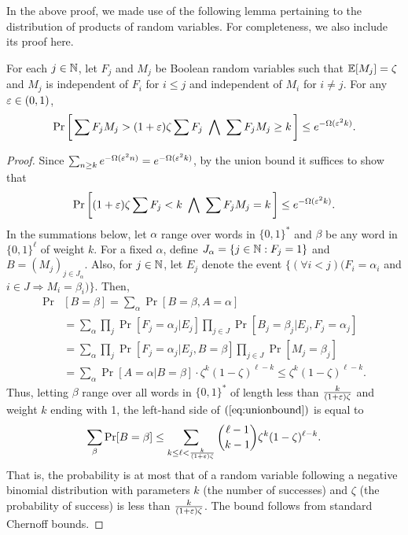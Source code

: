 In the above proof, we made use of the following lemma
pertaining to the distribution of products of random variables.
For completeness, we also include its proof here.

\begin{lemma}\label{lemma:negbin}%
	For each $j\in\mathbb{N}$, let $F_j$ and $M_j$ be Boolean random variables
	such that $\operatorname{\mathbb{E}}[M_j]=\zeta$ and $M_j$ is independent of $F_i$ for $i\leq j$ and
	independent of $M_i$ for $i\ne j$. For any $\varepsilon\in(0,1)$,
	\[
		\Pr\bigg[
			\sum F_jM_j>(1+\varepsilon)\zeta\sum F_j
			~\bigwedge~
			\sum F_jM_j\geq k
		\,\bigg]
		\leq e^{-\Omega(\varepsilon^2k)}
	.\]
\end{lemma}
\begin{proof}
	Since $\sum_{n\geq k}e^{-\Omega(\varepsilon^2n)}=e^{-\Omega(\varepsilon^2k)}$, by the union
	bound it suffices to show that
	\begin{equation}\label{eq:unionbound}
		\Pr\bigg[
			(1+\varepsilon)\zeta\sum F_j<k
			~\bigwedge~
			\sum F_jM_j=k
		\,\bigg]
		\leq e^{-\Omega(\varepsilon^2k)}
	.\end{equation}
	In the summations below, let $\alpha$ range over words in $\{0,1\}^*$ and
	$\beta$ be any word in $\{0,1\}^\ell$ of weight $k$.
	For a fixed $\alpha$, define $J_\alpha=\{j\in\mathbb{N}:F_j=1\}$
	and $B=(M_j)_{j\in J_\alpha}$.
	Also, for $j\in\mathbb{N}$, let $E_j$ denote the event
	$\{(\forall i<j)(F_i=\alpha_i$ and $i\in J\Rightarrow M_i=\beta_i)\}$.
	Then,
	\begin{align*}
		\Pr&[B=\beta]=\sum_\alpha\Pr[B=\beta,A=\alpha]
		\\&=\sum_\alpha\prod_j\Pr[F_j=\alpha_j|E_j]\prod_{j\in J}\Pr[B_j=\beta_j|E_j,F_j=\alpha_j]
		\\&=\sum_\alpha\prod_j\Pr[F_j=\alpha_j|E_j,B=\beta]\prod_{j\in J}\Pr[M_j=\beta_j]
		\\&=\sum_\alpha\Pr[A=\alpha|B=\beta]\cdot\zeta^k(1-\zeta)^{\ell-k}
		\leq\zeta^k(1-\zeta)^{\ell-k}
	.\end{align*}
	Thus, letting $\beta$ range over all words in $\{0,1\}^*$ of length less
	than $\frac k{(1+\varepsilon)\zeta}$ and weight $k$ ending with 1,
	the left-hand side of $(\ref{eq:unionbound})$ is equal to
	\[
		\sum_\beta\Pr[B=\beta]
			\leq\sum_{k\leq\ell<\frac k{(1+\varepsilon)\zeta}}{\ell-1\choose k-1}\zeta^k(1-\zeta)^{\ell-k}
	.\]
	That is, the probability is at most that of a random
	variable following a negative binomial distribution with parameters
	$k$ (the number of successes) and $\zeta$ (the probability of success)
	is less than $\frac k{(1+\varepsilon)\zeta}$. The bound follows from standard
	Chernoff bounds.
\end{proof}

